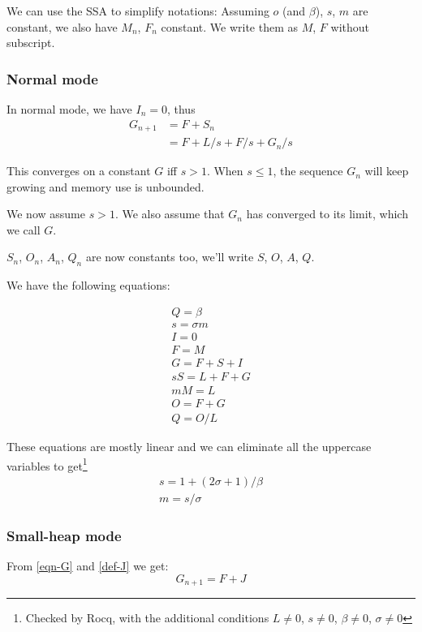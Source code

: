 \documentclass{article}
\begin{document}
We can use the SSA to simplify notations: Assuming $o$ (and $\beta$),
$s$, $m$ are constant, we also have $M_n$, $F_n$ constant. We
write them as $M$, $F$ without subscript.

\subsubsection{Normal mode}

In normal mode, we have $I_n = 0$, thus
\begin{equation}
\begin{split}
G_{n+1} & = F + S_n \\
        & = F + L/s + F/s + G_n/s
\end{split}
\end{equation}

This converges on a constant $G$ iff $s > 1$. When $s \leq 1$, the
sequence $G_n$ will keep growing and memory use is unbounded.

We now assume $s > 1$. We also assume that $G_n$ has converged to its
limit, which we call $G$.

$S_n$, $O_n$, $A_n$, $Q_n$ are now constants too, we'll write $S$,
$O$, $A$, $Q$.

We have the following equations:

\begin{gather*}
Q = \beta      \\
s = \sigma m   \\
I = 0          \\
F = M          \\
G = F + S + I  \\
sS = L + F + G \\
mM = L         \\
O = F + G      \\
Q = O / L
\end{gather*}

These equations are mostly linear and we can eliminate all the
uppercase variables to get\footnote{
Checked by Rocq, with the additional conditions
$L \neq 0$,
$s \neq 0$,
$\beta \neq 0$,
$\sigma \neq 0$
}
\begin{gather*}
s = 1 + (2\sigma + 1)/\beta \\
m = s/\sigma
\end{gather*}


\subsubsection{Small-heap mode}
From \eqref{eqn-G} and \eqref{def-J} we get:
\begin{equation}
G_{n+1} = F + J
\end{equation}
\end{document}

